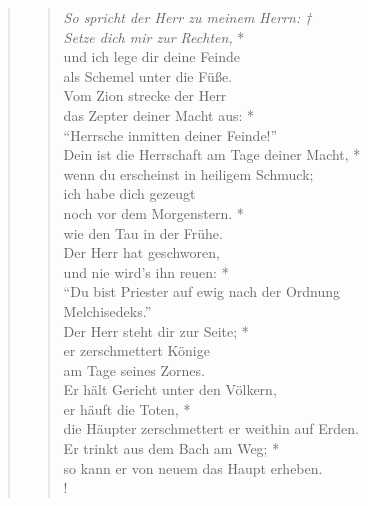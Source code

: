 \def\greinitialformat#1{{\fontsize{40}{40}\selectfont #1}}
\gresetfirstlineaboveinitial{\small \textcolor{red}{Ps 109(110)}}{}
\setaboveinitialseparation{0.72mm}


\medskip


\begin{quote}
\begin{verse}

{\it{So spricht der Herr zu meinem Herrn: †\\
Setze dich mir zur Rechten,}} *\\
und ich lege dir deine Feinde\\
als Schemel unter die Füße.\\
\vin Vom Zion strecke der Herr \\
\vin das Zepter deiner Macht aus: *\\
\vin ``Herrsche inmitten deiner Feinde!''\\
Dein ist die Herrschaft am Tage deiner Macht, *\\
wenn du erscheinst in heiligem Schmuck;\\
\vin ich habe dich gezeugt\\ 
\vin noch vor dem Morgenstern. *\\
\vin wie den Tau in der Frühe.\\
Der Herr hat geschworen,\\
und nie wird’s ihn reuen: *\\
``Du bist Priester auf ewig nach der Ordnung \\
Melchisedeks.''\\
\vin Der Herr steht dir zur Seite; *\\
\vin er zerschmettert Könige\\
\vin am Tage seines Zornes.\\
Er hält Gericht unter den Völkern,\\
er häuft die Toten, *\\
die Häupter zerschmettert er weithin auf Erden.\\
Er trinkt aus dem Bach am Weg; *\\
so kann er von neuem das Haupt erheben.\\!
\end{verse}
\end{quote}

